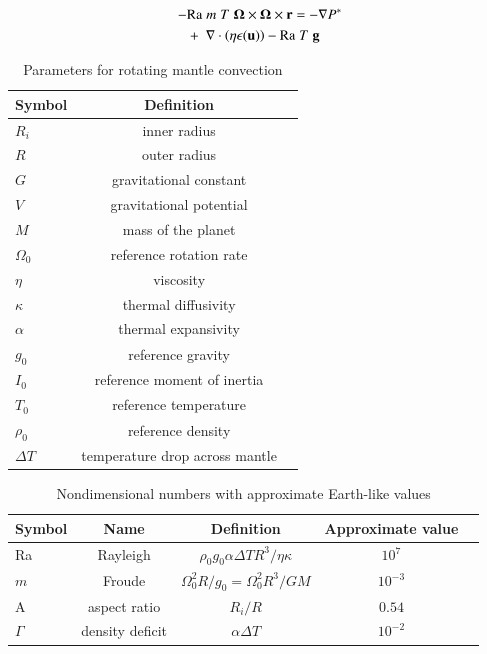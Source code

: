 \documentclass[preprint,12pt,authoryear]{elsarticle}
\newcommand{\mitbf}[1]{\hbox{\mathversion{bold}$#1$}}
\begin{document}
\begin{equation}
\begin{aligned}
 - & \mathrm{Ra} \; m \; T \; \mitbf{\Omega} \times \mitbf{\Omega} \times \mathbf{r} = - \nabla P^* \\ 
&+ \; \nabla \cdot \left( \eta \epsilon (\mathbf{u}) \right) - \mathrm{Ra} \; T \; \mathbf{g}
\end{aligned}
\end{equation}

  
\fi

\begin{table}
\centering
\caption{Parameters for rotating mantle convection}
\label{tab:parameters}
\begin{tabular}{@{}lcc}
Symbol & Definition\\
\hline
$R_i$ & inner radius \\
$R$ & outer radius \\
$G$ & gravitational constant \\
$V$ & gravitational potential \\
$M$ & mass of the planet \\
$\Omega_0$ & reference rotation rate \\
$\eta$ & viscosity \\
$\kappa$ & thermal diffusivity \\
$\alpha$ &  thermal expansivity \\ 
$g_0$ & reference gravity \\
$I_0$ & reference moment of inertia \\
$T_0$ & reference temperature \\
$\rho_0$ & reference density \\ 
$\Delta T$ & temperature drop across mantle
\end{tabular}
\end{table}

\begin{table}
\centering
\caption{Nondimensional numbers with approximate Earth-like values}
\label{tab:nondim}
\begin{tabular}{@{}lcccc}
Symbol &  Name & Definition & Approximate value \\
\hline
Ra & Rayleigh &  $\rho_0 g_0 \alpha \Delta T R^3/\eta \kappa$ & $10^7$\\
$m$ & Froude & $\Omega_0^2 R/g_0 = \Omega_0^2 R^3/GM$ & $10^{-3}$ \\
A & aspect ratio & $R_i/R$ & $0.54$ \\
$\Gamma$ & density deficit &$ \alpha \Delta T$ & $10^{-2}$ \\
\end{tabular}
\end{table}
 
\end{document}
